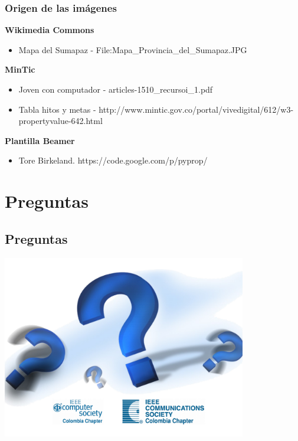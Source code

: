 \begin{frame} %
	\frametitle{Origen de las imágenes}
    {\bf Wikimedia Commons}

\begin{itemize}
        \item Mapa del Sumapaz - File:Mapa\_Provincia\_del\_Sumapaz.JPG
    \end{itemize}

{\bf MinTic }

\begin{itemize}
        \item Joven con computador - articles-1510\_recursoi\_1.pdf
        \item Tabla hitos y metas - http://www.mintic.gov.co/portal/vivedigital/612/w3-propertyvalue-642.html
\end{itemize}

{\bf Plantilla Beamer}

\begin{itemize}
    \item  Tore Birkeland. https://code.google.com/p/pyprop/
\end{itemize}

\end{frame}    

\section{ Preguntas}
\subsection{Preguntas}
\begin{frame}
				\includegraphics[width=0.8\textwidth]{preguntas.pdf}

\end{frame}


